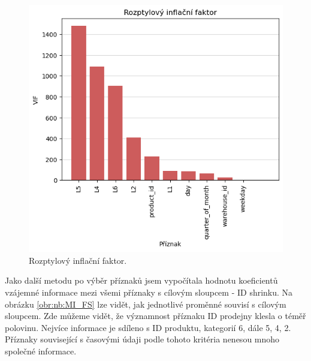 \begin{figure}[h!]
      \centering
      \includegraphics[width=\textwidth]{obrazky/zntb/VIF.png} %
      \caption{Rozptylový inflační faktor.}
      \label{obr:nb:vif}

    \end{figure}

Jako další metodu po výběr příznaků jsem vypočítala hodnotu koeficientů vzájemné informace mezi všemi příznaky s cílovým sloupcem - ID shrinku. Na obrázku \ref*{obr:nb:MI_FS} lze vidět, jak jednotlivé proměnné souvisí s cílovým sloupcem. 
Zde můžeme vidět, že významnost příznaku ID prodejny klesla o téměř polovinu. Nejvíce informace je sdíleno s ID produktu, kategorií 6, dále 5, 4, 2. Příznaky související s časovými údaji podle tohoto kritéria nenesou mnoho společné informace.

